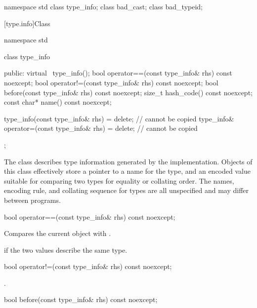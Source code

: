 \begin{codeblock}
namespace std {
  class type_info;
  class bad_cast;
  class bad_typeid;
}
\end{codeblock}

[type.info]{Class }

%
\begin{codeblock}
namespace std {
  class type_info {
  public:
    virtual ~type_info();
    bool operator==(const type_info& rhs) const noexcept;
    bool operator!=(const type_info& rhs) const noexcept;
    bool before(const type_info& rhs) const noexcept;
    size_t hash_code() const noexcept;
    const char* name() const noexcept;

    type_info(const type_info& rhs) = delete;                   // cannot be copied
    type_info& operator=(const type_info& rhs) = delete;        // cannot be copied
  };
}
\end{codeblock}

\pnum
The class
describes type information generated by the implementation.
Objects of this class effectively store a pointer to a name for the type, and
an encoded value suitable for comparing two types for equality or collating order.
The names, encoding rule, and collating sequence for types are all unspecified
%
and may differ between programs.

%
\begin{itemdecl}
bool operator==(const type_info& rhs) const noexcept;
\end{itemdecl}

\begin{itemdescr}
\pnum
\effects
Compares the current object with .

\pnum
\returns
{}
if the two values describe the same type.
\end{itemdescr}

%
\begin{itemdecl}
bool operator!=(const type_info& rhs) const noexcept;
\end{itemdecl}

\begin{itemdescr}
\pnum
\returns
{}.
\end{itemdescr}

%
\begin{itemdecl}
bool before(const type_info& rhs) const noexcept;
\end{itemdecl}

